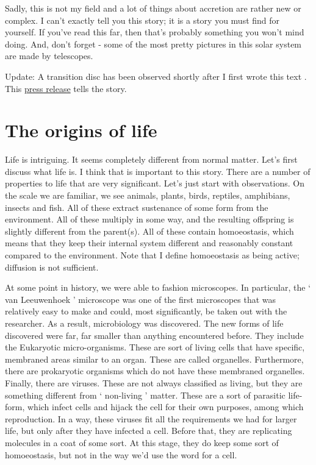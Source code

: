 \begin{multicols}{2}
Sadly, this is not my field and a lot of things about accretion are rather new or complex. I can't exactly tell you this story; it is a story you must find for yourself. If you've read this far, then that's probably something you won't mind doing. And, don't forget - some of the most pretty pictures in this solar system are made by telescopes.

Update: A transition disc has been observed shortly after I first wrote this text \cite{naturetransitiondisc}. This \href{http://news.stanford.edu/pr/2015/pr-proto-planet-forming-111815.html}{press release} tells the story.

\section{The origins of life}
Life is intriguing. It seems completely different from normal matter. Let's first discuss what life is. I think that is important to this story. There are a number of properties to life that are very significant. Let's just start with observations. On the scale we are familiar, we see animals, plants, birds, reptiles, amphibians, insects and fish. All of these extract sustenance of some form from the environment. All of these multiply in some way, and the resulting offspring is slightly different from the parent(s). All of these contain homoeostasis, which means that they keep their internal system different and reasonably constant compared to the environment. Note that I define homoeostasis as being active; diffusion is not sufficient.

At some point in history, we were able to fashion microscopes. In particular, the ‘ van Leeuwenhoek ’ microscope was one of the first microscopes that was relatively easy to make and could, most significantly, be taken out with the researcher. As a result, microbiology was discovered. The new forms of life discovered were far, far smaller than anything encountered before. They include the Eukaryotic micro-organisms. These are sort of living cells that have specific, membraned areas similar to an organ. These are called organelles. Furthermore, there are prokaryotic organisms which do not have these membraned organelles. Finally, there are viruses. These are not always classified as living, but they are something different from ‘ non-living ’ matter. These are a sort of parasitic life-form, which infect cells and hijack the cell for their own purposes, among which reproduction. In a way, these viruses fit all the requirements we had for larger life, but only after they have infected a cell. Before that, they are replicating molecules in a coat of some sort. At this stage, they do keep some sort of homoeostasis, but not in the way we'd use the word for a cell.


\end{multicols}
